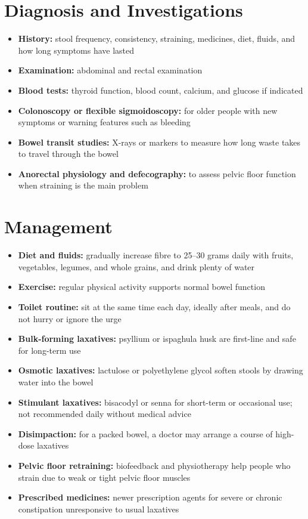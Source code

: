 \section*{Diagnosis and Investigations}
\begin{itemize}
    \item \textbf{History:} stool frequency, consistency, straining, medicines, diet, fluids, and how long symptoms have lasted
    \item \textbf{Examination:} abdominal and rectal examination
    \item \textbf{Blood tests:} thyroid function, blood count, calcium, and glucose if indicated
    \item \textbf{Colonoscopy or flexible sigmoidoscopy:} for older people with new symptoms or warning features such as bleeding
    \item \textbf{Bowel transit studies:} X-rays or markers to measure how long waste takes to travel through the bowel
    \item \textbf{Anorectal physiology and defecography:} to assess pelvic floor function when straining is the main problem
\end{itemize}

\section*{Management}
\begin{itemize}
    \item \textbf{Diet and fluids:} gradually increase fibre to 25--30 grams daily with fruits, vegetables, legumes, and whole grains, and drink plenty of water
    \item \textbf{Exercise:} regular physical activity supports normal bowel function
    \item \textbf{Toilet routine:} sit at the same time each day, ideally after meals, and do not hurry or ignore the urge
    \item \textbf{Bulk-forming laxatives:} psyllium or ispaghula husk are first-line and safe for long-term use
    \item \textbf{Osmotic laxatives:} lactulose or polyethylene glycol soften stools by drawing water into the bowel
    \item \textbf{Stimulant laxatives:} bisacodyl or senna for short-term or occasional use; not recommended daily without medical advice
    \item \textbf{Disimpaction:} for a packed bowel, a doctor may arrange a course of high-dose laxatives
    \item \textbf{Pelvic floor retraining:} biofeedback and physiotherapy help people who strain due to weak or tight pelvic floor muscles
    \item \textbf{Prescribed medicines:} newer prescription agents for severe or chronic constipation unresponsive to usual laxatives
\end{itemize}

